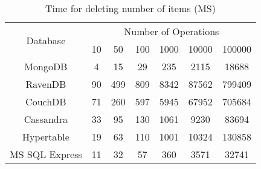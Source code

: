 \begin{table}[ht]
\centering
\begin{tabular}{c|cccccc}
\multirow{2}{*}{Database} & \multicolumn{6}{c}{Number of Operations} \\
& 10 & 50 & 100 & 1000 & 10000 & 100000 \\
\hline
MongoDB & 4 & 15 & 29 & 235 & 2115 & 18688 \\
RavenDB & 90 & 499 & 809 & 8342 & 87562 & 799409 \\
CouchDB & 71 & 260 & 597 & 5945 & 67952 & 705684 \\
Cassandra & 33 & 95 & 130 & 1061 & 9230 & 83694 \\
Hypertable & 19 & 63 & 110 & 1001 & 10324 & 130858 \\
MS SQL Express & 11 & 32 & 57 & 360 & 3571 & 32741 \\
\end{tabular}
\caption{Time for deleting number of items (MS) \cite{Li_Manoharan_2013}}
\label{tab:delete_times_db}
\end{table}

